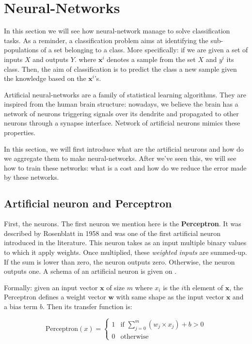 
\section{Neural-Networks}
\label{sec:neural_networks}

	In this section we will see how neural-network manage to solve classification tasks. As a reminder, a classification problem aims at identifying the sub-populations of a set belonging to a class. More specifically: if we are given a set of inputs $X$ and outputs $Y$. where $\boldsymbol{x}^i$ denotes a sample from the set $X$ and $y^i$ its class. Then, the aim of classification is to predict the class a new sample given the knowledge based on the $\boldsymbol{x}^i$'s.

	Artificial neural-networks are a family of statistical learning algorithms. They are inspired from the human brain structure: nowadays, we believe the brain has a network of neurons triggering signals over its dendrite and propagated to other neurons through a synapse interface. Network of artificial neurons mimics these properties.

	In this section, we will first introduce what are the artificial neurons and how do we aggregate them to make neural-networks. After we've seen this, we will see how to train these networks: what is a cost and how do we reduce the error made by these networks.


	\subsection{Artificial neuron and Perceptron}
	\label{sec:Artificial_neurons}
		First, the neurons. The first neuron we mention here is the \textbf{Perceptron}. It was described by Rosenblatt in 1958 \cite{rosenblatt1958perceptron} and was one of the first artificial neuron introduced in the literature. This neuron takes as an input multiple binary values to which it apply weights. Once multiplied, these \textit{weighted inputs} are summed-up. If the sum is lower than zero, the neuron outputs zero. Otherwise, the neuron outputs one. A schema of an artificial neuron is given on .

		Formally: given an input vector $\boldsymbol{x}$ of size $m$ where $x_i$ is the $i$th element of $\boldsymbol{x}$, the Perceptron defines a weight vector $\boldsymbol{w}$ with same shape as the input vector $\boldsymbol{x}$ and a bias term $b$. Then its transfer function is:

		$$ \text{Perceptron}(x) = \begin{cases}1 & \text{if } \sum_{j=0}^m (w_j \times x_j) + b > 0\\0 & \text{otherwise}\end{cases} $$

